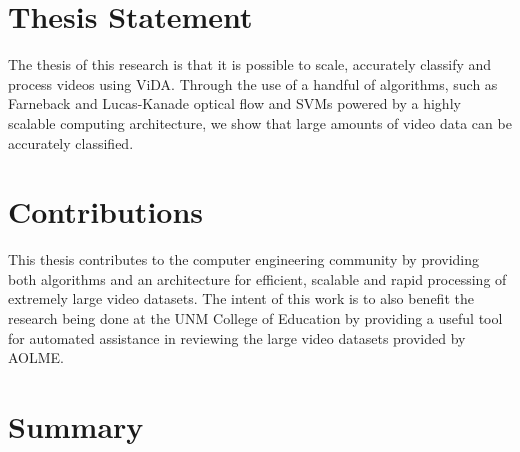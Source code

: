 \section{\label{section:thesis_statement}Thesis Statement}
The thesis of this research is that it is possible to scale, accurately
classify and process videos using ViDA. Through the use of a handful of algorithms,
such as Farneback and Lucas-Kanade optical flow and SVMs powered by a highly scalable
computing architecture, we show that large amounts of video data can be
accurately classified.

\section{\label{section:contributions}Contributions}
This thesis contributes to the computer engineering community by providing both
algorithms and an architecture for efficient, scalable and rapid processing of
extremely large video datasets. The intent of this work is to also benefit
the research being done at the UNM College of Education by providing a useful
tool for automated assistance in reviewing the large video datasets provided
by AOLME. 

\section{\label{section:summary}Summary}
